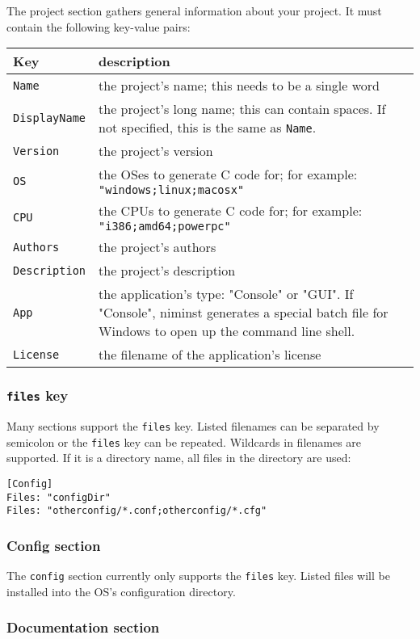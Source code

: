 The project section gathers general information about your project. It
must contain the following key-value pairs:

\begin{longtable}[]{@{}ll@{}}
\toprule
Key & description\tabularnewline
\midrule
\endhead
\texttt{Name} & the project's name; this needs to be a single
word\tabularnewline
\texttt{DisplayName} & the project's long name; this can contain spaces.
If not specified, this is the same as \texttt{Name}.\tabularnewline
\texttt{Version} & the project's version\tabularnewline
\texttt{OS} & the OSes to generate C code for; for example:
\texttt{"windows;linux;macosx"}\tabularnewline
\texttt{CPU} & the CPUs to generate C code for; for example:
\texttt{"i386;amd64;powerpc"}\tabularnewline
\texttt{Authors} & the project's authors\tabularnewline
\texttt{Description} & the project's description\tabularnewline
\texttt{App} & the application's type: "Console" or "GUI". If "Console",
niminst generates a special batch file for Windows to open up the
command line shell.\tabularnewline
\texttt{License} & the filename of the application's
license\tabularnewline
\bottomrule
\end{longtable}

\hypertarget{files-key}{%
\subsubsection{\texorpdfstring{\texttt{files}
key}{files key}}\label{files-key}}

Many sections support the \texttt{files} key. Listed filenames can be
separated by semicolon or the \texttt{files} key can be repeated.
Wildcards in filenames are supported. If it is a directory name, all
files in the directory are used:

\begin{verbatim}
[Config]
Files: "configDir"
Files: "otherconfig/*.conf;otherconfig/*.cfg"
\end{verbatim}

\hypertarget{config-section}{%
\subsubsection{Config section}\label{config-section}}

The \texttt{config} section currently only supports the \texttt{files}
key. Listed files will be installed into the OS's configuration
directory.

\hypertarget{documentation-section}{%
\subsubsection{Documentation section}\label{documentation-section}}

